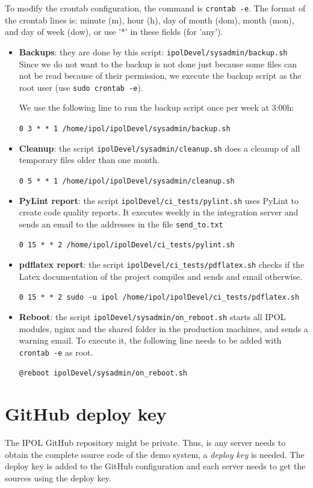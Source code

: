 \documentclass[a4paper,12pt]{article}
\begin{document}
To modify the crontab configuration, the command is {\tt crontab -e}. The format of the crontab lines is: minute (m), hour (h), day of month (dom), month (mon), and day of week (dow), or use '*' in these fields (for 'any').

\begin{itemize}
    \item \textbf{Backups}: they are done by this script: {\tt ipolDevel/sysadmin/backup.sh}
Since we do not want to the backup is not done just because some files can not be read because of their permission, we execute the backup script as the root user (use {\tt sudo crontab -e}).

We use the following line to run the backup script once per week at 3:00h:

    {\tt 0 3 * * 1 /home/ipol/ipolDevel/sysadmin/backup.sh}

    \item \textbf{Cleanup}: the script {\tt ipolDevel/sysadmin/cleanup.sh} does a cleanup of all temporary files older than one month.

    {\tt 0 5 * * 1 /home/ipol/ipolDevel/sysadmin/cleanup.sh}

    \item \textbf{PyLint report}: the script {\tt ipolDevel/ci\_tests/pylint.sh} uses PyLint to create code quality reports. It executes weekly in the integration server and sends an email to the addresses in the file {\tt send\_to.txt}

    {\tt 0 15 * * 2 /home/ipol/ipolDevel/ci\_tests/pylint.sh}

    \item \textbf{pdflatex report}: the script {\tt ipolDevel/ci\_tests/pdflatex.sh} checks if the Latex documentation of the project compiles and sends and email otherwise.

    {\tt 0 15 * * 2 sudo -u ipol /home/ipol/ipolDevel/ci\_tests/pdflatex.sh}

    \item \textbf{Reboot}: the script {\tt ipolDevel/sysadmin/on\_reboot.sh} starts all IPOL modules, nginx and the shared folder in the production machines, and sends a warning email. To execute it, the following line needs to be added with {\tt crontab -e} as root.

    {\tt @reboot ipolDevel/sysadmin/on\_reboot.sh}
\end{itemize}

\section{GitHub deploy key}
The IPOL GitHub repository might be private. Thus, is any server needs to obtain the complete source code of the demo system, a \emph{deploy key} is needed. The deploy key is added to the GitHub configuration and each server needs to get the sources using the deploy key.
\end{document}
